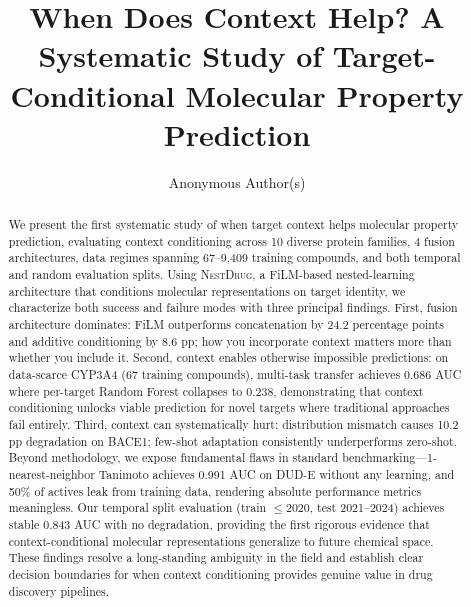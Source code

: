 \documentclass[runningheads]{llncs}
\newcommand{\methodname}{\textsc{NestDrug}}
\begin{document}
\title{When Does Context Help? A Systematic Study of Target-Conditional Molecular Property Prediction}

\author{Anonymous Author(s)}

\maketitle

\begin{abstract}
We present the first systematic study of when target context helps molecular property prediction, evaluating context conditioning across 10 diverse protein families, 4 fusion architectures, data regimes spanning 67--9,409 training compounds, and both temporal and random evaluation splits. Using \methodname{}, a FiLM-based nested-learning architecture that conditions molecular representations on target identity, we characterize both success and failure modes with three principal findings. First, fusion architecture dominates: FiLM outperforms concatenation by 24.2 percentage points and additive conditioning by 8.6 pp; how you incorporate context matters more than whether you include it. Second, context enables otherwise impossible predictions: on data-scarce CYP3A4 (67 training compounds), multi-task transfer achieves 0.686 AUC where per-target Random Forest collapses to 0.238, demonstrating that context conditioning unlocks viable prediction for novel targets where traditional approaches fail entirely. Third, context can systematically hurt: distribution mismatch causes 10.2 pp degradation on BACE1; few-shot adaptation consistently underperforms zero-shot. Beyond methodology, we expose fundamental flaws in standard benchmarking---1-nearest-neighbor Tanimoto achieves 0.991 AUC on DUD-E without any learning, and 50\% of actives leak from training data, rendering absolute performance metrics meaningless. Our temporal split evaluation (train $\leq$2020, test 2021--2024) achieves stable 0.843 AUC with no degradation, providing the first rigorous evidence that context-conditional molecular representations generalize to future chemical space. These findings resolve a long-standing ambiguity in the field and establish clear decision boundaries for when context conditioning provides genuine value in drug discovery pipelines.

\end{abstract}
\end{document}
